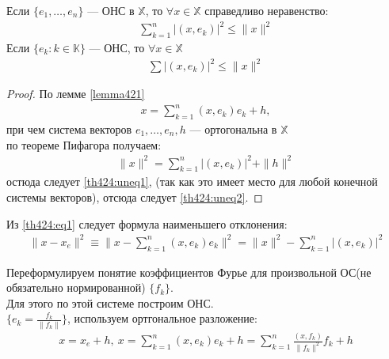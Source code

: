 \begin{theorem}
  \label{th424}
  Если $\{e_1, \dots, e_n\}$ --- ОНС в $\mathbb{X}$, то $\forall x \in
  \mathbb{X}$ справедливо неравенство:
  \begin{gather}
    \sum\limits_{k = 1}^{n} |(x, e_k)|^2 \leq \|x\|^2
    \label{th424:uneq1}
  \end{gather}
  Если $\{e_k: k \in \mathbb{K}\}$ --- ОНС, то $\forall x \in \mathbb{X}$
  \begin{gather}
    \sum |(x, e_k)|^2 \leq \|x\|^2
    \label{th424:uneq2}
  \end{gather}
\end{theorem}

\begin{proof}
  По лемме \eqref{lemma421}
  \begin{gather*}
    x = \sum\limits_{k = 1}^{n} (x, e_k)e_k + h,
  \end{gather*}
  при чем система векторов $e_1, \dots, e_n, h$ --- ортогональна в $\mathbb{X}$
  \\
  по теореме Пифагора получаем:
  \begin{gather}
    \|x\|^2 = \sum\limits_{k = 1}^{n} |(x, e_k)|^2 + \|h\|^2
    \label{th424:eq1}
  \end{gather}
  остюда следует \eqref{th424:uneq1}, (так как это имеет место для любой
  конечной системы векторов), отсюда следует \eqref{th424:uneq2}.
\end{proof}

\begin{remark}
  Из \eqref{th424:eq1} следует формула наименьшего отклонения:
  \begin{gather}
    \|x - x_e\|^2 \equiv \|x - \sum\limits_{k = 1}^{n} (x, e_k) e_k \|^2 =
    \|x\|^2 - \sum\limits_{k = 1}^{n} |(x, e_k)|^2
    \label{th424:eq3}
  \end{gather}
\end{remark}

Переформулируем понятие коэффициентов Фурье для произвольной ОС(не обязательно
нормированной) $\{f_k\}$. \\
Для этого по этой системе построим ОНС. \\
$\{e_k = \frac{f_k}{\|f_k\|}\}$, используем ортгональное разложение:
\begin{gather*}
  x = x_e +
  h, \ x = \sum\limits_{k = 1}^{n} (x, e_k) e_k + h = \sum\limits_{k =
  1}^{n} \frac{(x, f_k)}{\|f_k\|^2} f_k + h
\end{gather*}

